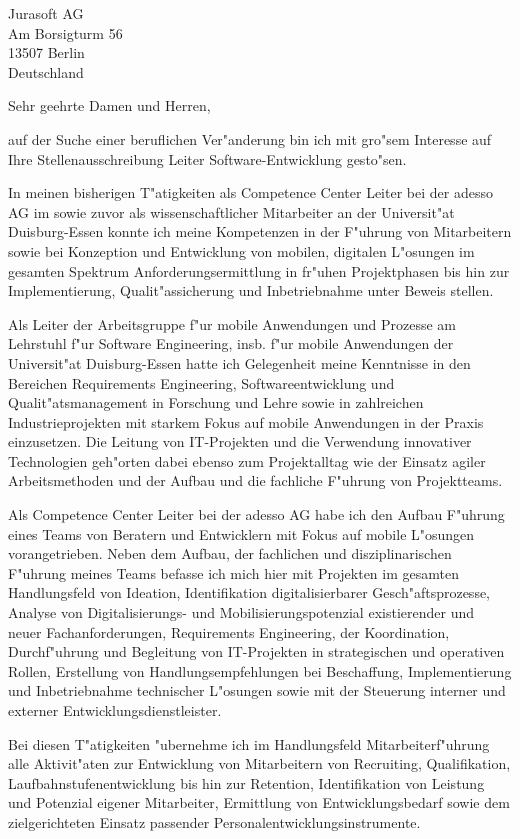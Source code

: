 \documentclass[10pt,a4paper]{dinbrief}
\date{\today}
\begin{document}
 
\begin{letter}  
{%
	Jurasoft AG\\
	Am Borsigturm 56\\
	13507 Berlin\\
	Deutschland
}
\subject{\bf Bewerbung Leiter Software-Entwicklung}
\opening{Sehr geehrte Damen und Herren,}
auf der Suche einer beruflichen Ver"anderung bin ich mit gro"sem Interesse auf Ihre Stellenausschreibung Leiter Software-Entwicklung gesto"sen. 

In meinen bisherigen T"atigkeiten als Competence Center Leiter bei der adesso AG im sowie zuvor als wissenschaftlicher Mitarbeiter an der Universit"at Duisburg-Essen konnte ich meine Kompetenzen in der F"uhrung von Mitarbeitern sowie bei Konzeption und Entwicklung von mobilen, digitalen L"osungen im gesamten Spektrum Anforderungsermittlung in fr"uhen Projektphasen bis hin zur Implementierung, Qualit"assicherung und Inbetriebnahme unter Beweis stellen.

Als Leiter der Arbeitsgruppe f"ur mobile Anwendungen und Prozesse am Lehrstuhl f"ur Software Engineering, insb. f"ur mobile Anwendungen der Universit"at Duisburg-Essen hatte ich Gelegenheit meine Kenntnisse in den Bereichen Requirements Engineering, Softwareentwicklung und Qualit"atsmanagement in Forschung und Lehre sowie in zahlreichen Industrieprojekten mit starkem Fokus auf mobile Anwendungen in der Praxis einzusetzen. Die Leitung von IT-Projekten und die Verwendung innovativer Technologien geh"orten dabei ebenso zum Projektalltag wie der Einsatz agiler Arbeitsmethoden und der Aufbau und die fachliche  F"uhrung von Projektteams.

Als Competence Center Leiter bei der adesso AG habe ich den Aufbau F"uhrung eines Teams von Beratern und Entwicklern mit Fokus auf mobile L"osungen vorangetrieben. Neben dem Aufbau, der fachlichen und disziplinarischen F"uhrung meines Teams befasse ich mich hier mit Projekten im gesamten Handlungsfeld von Ideation, Identifikation digitalisierbarer Gesch"aftsprozesse, Analyse von Digitalisierungs- und Mobilisierungspotenzial existierender und neuer Fachanforderungen, Requirements Engineering, der Koordination, Durchf"uhrung und Begleitung von IT-Projekten in strategischen und operativen Rollen, Erstellung von Handlungsempfehlungen bei Beschaffung, Implementierung und Inbetriebnahme technischer L"osungen sowie mit der Steuerung interner und externer Entwicklungsdienstleister. 

Bei diesen T"atigkeiten "ubernehme ich im Handlungsfeld Mitarbeiterf"uhrung alle Aktivit"aten zur Entwicklung von Mitarbeitern von Recruiting, Qualifikation, Laufbahnstufenentwicklung bis hin zur Retention, Identifikation von Leistung und Potenzial eigener Mitarbeiter, Ermittlung von Entwicklungsbedarf sowie dem zielgerichteten Einsatz passender Personalentwicklungsinstrumente.


\end{letter}
\end{document}
